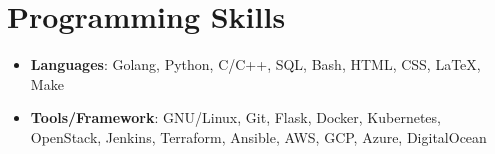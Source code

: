 \documentclass[letterpaper,10pt]{article}
\begin{document}
\section{Programming Skills}
 \vspace{4pt}
    \begin{itemize}[leftmargin=*]
    \setlength{\itemsep}{0pt}
    \item{
      \textbf{Languages}{: Golang, Python, C/C++, SQL, Bash, HTML, CSS, \LaTeX, Make}}
    \item{
	\textbf{Tools/Framework}{: GNU/Linux, Git, Flask, Docker, Kubernetes, OpenStack, Jenkins, Terraform, Ansible, AWS, GCP, Azure, DigitalOcean}}
  
    \end{itemize}



\end{document}
